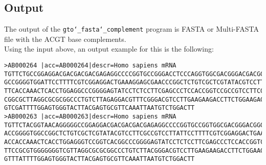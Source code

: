 \subsection*{Output}
The output of the \texttt{gto\char`_fasta\char`_complement} program is FASTA or Multi-FASTA file with the ACGT base complements.\\
Using the input above, an output example for this is the following:
\begin{lstlisting}
>AB000264 |acc=AB000264|descr=Homo sapiens mRNA 
TGTTCTGCCGGAGGACGACGACGACGAGAGGCCCCGGTGCCGGGACCTCCCAGGTGGCGACGGGACGACGGTAACAGGG
GCCGGGGTGGATTCCTTTTCGTCGGAGGACTGAAAGGAGCGAACCCGGCTCTGTCGCTCGTATACGTCCTTCGCCGTCC
TTCACCAAACTCACCTGGAGGCCCGGGGAGTATCCTCTCCTTCGAGCCCTCCACCGGTCCGCCGTCCTTCGTCCGGTCA
CGGCGCTTAGGCGCGCGGCCCTGTCTTAGAGGACGTTTCGGGACGTCCTTGAAGAAGACCTTCTGGAAGAGGTGGGGGG
GTCGATTTTGGAGTGGGTACTTACGAGTGCGTTCAAATTAATGTCTGGACTT
>AB000263 |acc=AB000263|descr=Homo sapiens mRNA 
TGTTCTACGGTAACAGGGGGCCGGAGGACGACGACGACGAGAGGCCCCGGTGCCGGTGGCGACGGGACGGGGACCTCCC
ACCGGGGTGGCCGGCTCTGTCGCTCGTATACGTCCTTCGCCGTCCTTATTCCTTTTCGTCGGAGGACTGAAAGGAGCGA
ACCACCAAACTCACCTGGAGGGTCCGGTCACGGCCCGGGGAGTATCCTCTCCTTCGAGCCCTCCACCGGTCCGCCGTCC
TTCCGCGTGGGGGGGTCGTTAGGCGCGCGGCCCTGTCTTACGGGACGTCCTTGAAGAAGACCTTCTGGAAGAGGAGGAC
GTTTATTTTGGAGTGGGTACTTACGAGTGCGTTCAAATTAATGTCTGGACTT
\end{lstlisting}